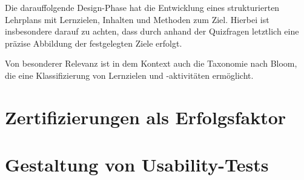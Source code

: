 Die darauffolgende Design-Phase hat die Entwicklung eines strukturierten Lehrplans mit Lernzielen, Inhalten und Methoden zum Ziel.
Hierbei ist insbesondere darauf zu achten, dass durch anhand der Quizfragen letztlich eine präzise Abbildung der festgelegten Ziele erfolgt.

Von besonderer Relevanz
ist in dem Kontext auch die Taxonomie nach Bloom, die eine Klassifizierung von Lernzielen und -aktivitäten ermöglicht.
\section{Zertifizierungen als Erfolgsfaktor}
\section{Gestaltung von Usability-Tests}